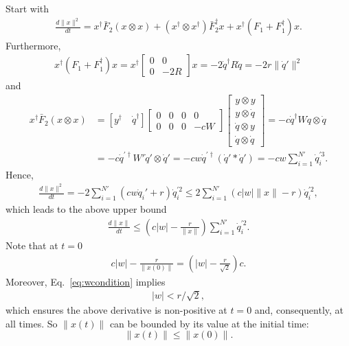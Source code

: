 \documentclass[superscriptaddress,onecolumn,nofootinbib,longbibliography,a4paper,accepted=2026-09-29]{quantumarticle}
\theoremstyle{plain}
\theoremstyle{definition}
\numberwithin{thm}{section}
\numberwithin{assumption}{section}
\numberwithin{lemma}{section}
\numberwithin{prop}{section}
\numberwithin{cor}{section}
\numberwithin{definition}{section}
\numberwithin{rmk}{section}
\numberwithin{equation}{section}
\begin{document}
Start with
\begin{align}
\frac{d\| x\|^2}{dt} = x^\dag \bar{F}_2 (x \otimes x) + (x^\dag \otimes x^\dag) \bar{F}_2^\dag x + x^\dag (F_1 + F_1^\dag) x.
\end{align}
Furthermore,
\begin{align}
   x^\dag( F_1 + F_1^\dag ) x= x^\dag\begin{bmatrix}
        0 & 0 \\  0 & -2R
    \end{bmatrix} x = -2 \dot{q}^\dag R \dot{q} = -2 r \| \dot{q}'\|^2
\end{align}
and
\begin{align}
    x^\dag \bar{F}_2 (x \otimes x) & = [ y^\dag \quad \dot{q}^\dag] \begin{bmatrix}
        0 & 0 & 0 & 0 \\
        0 & 0 & 0 & -c W
    \end{bmatrix} \begin{bmatrix}
        y \otimes y\\ 
        y \otimes \dot{q} \\
        \dot{q} \otimes y \\ \dot{q} \otimes \dot{q} 
    \end{bmatrix} =  -c \dot{q}^\dag W \dot{q} \otimes \dot{q}   \\ & =-c \dot{q}^{\prime\dag} W' \dot{q}' \otimes \dot{q}' = -c w \dot{q}^{\prime\dag} (\dot{q}' \ast \dot{q}') = -c w \sum_{i=1}^{N'} \dot{q}_i^{\prime 3}. 
\end{align}
Hence,
\begin{align}
    {\frac{d \|x\|^2}{dt}} = -2\sum_{i=1}^{N'} (cw\dot{q}_i'+r) \dot{q}_i^{\prime 2} \leq   2\sum_{i=1}^{N'} (c|w|\|x\|-r) \dot{q}_i^{\prime 2},
\end{align}
which leads to the above upper bound
\begin{align}
    {\frac{d \|x\|}{dt}} \leq \left(c|w|-\frac{r}{\|x\|}\right)  \sum_{i=1}^{N'}  \dot{q}_i^{\prime 2}.
\end{align}
Note that at $t =0$ 
\begin{align}
    c|w|-\frac{r}{\|x(0)\|} = \left(|w| - \frac{r}{\sqrt{2}}\right)c.
\end{align}
Moreover, Eq.~\eqref{eq:wcondition} implies
\begin{align}
    |w|<r/\sqrt{2},
\end{align} 
which ensures the above derivative is non-positive at $t=0$ and, consequently, at all times. So $\|x(t)\|$ can be bounded by its value at the initial time:
\begin{equation}
    \label{eq:normUpperBound}
    \|x(t)\|\leq \|x(0)\|.
\end{equation}
\end{document}
